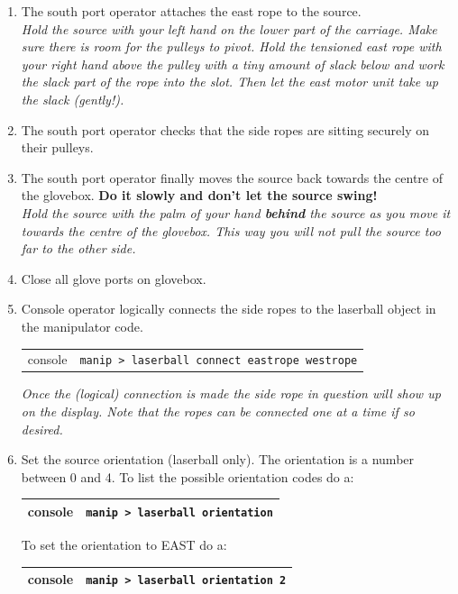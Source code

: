 \begin{enumerate}
\item \CheckBox[name=aesr14]{} The south port operator attaches the east rope to the source. \\ {\it Hold the source with your left hand on the lower part of the carriage. Make sure there is room for the pulleys to pivot. Hold the tensioned east rope with your right hand above the pulley with a tiny amount of slack below and work the slack part of the rope into the slot. Then let the east motor unit take up the slack (gently!).}
\item \CheckBox[name=aesr15]{} The south port operator checks that the side ropes are sitting securely on their pulleys. 
\item \CheckBox[name=aesr16]{} The south port operator finally moves the source back towards the centre of the glovebox. {\bf Do it slowly and don't let the source swing!} \\ {\it Hold the source with the palm of your hand {\bf behind} the source as you move it towards the centre of the glovebox. This way you will not pull the source too far to the other side.}
\item \CheckBox[name=aesr17]{} Close all glove ports on glovebox.
\item \CheckBox[name=aesr18]{} Console operator logically connects the side ropes to the laserball object in the manipulator code.
\begin{center}
\begin{tabular}{|c|c|}
console & \verb+manip > laserball connect eastrope westrope+ \\
\end{tabular}
\end{center}
{\it Once the (logical) connection is made the side rope in question will show up on the display. Note that the ropes can be connected one at a time if so desired.}
\item \CheckBox[name=aesr19]{} Set the source orientation (laserball only). The orientation is a number between 0 and 4. To list the possible orientation codes do a:
\begin{center}
\begin{tabular}{|c|c|}
\hline
console & \verb+manip > laserball orientation+ \\
\hline
\end{tabular}
\end{center}
To set the orientation to EAST do a:
\begin{center}
\begin{tabular}{|c|c|}
\hline
console & \verb+manip > laserball orientation 2+ \\
\hline
\end{tabular}
\end{center}
\end{enumerate}


